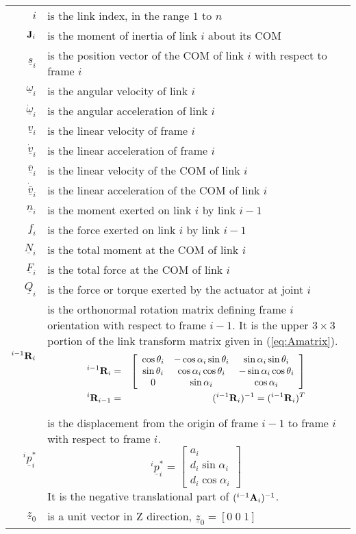 \documentclass{article}
\renewcommand{\vec}[1]{\underline{#1}}
\begin{document}
\begin{longtable}{r p{12cm}}
$i$ & is the link index, in the range $1$ to $n$ \\
${\bf J}_i$ & is the moment of inertia of link $i$ about its COM\\
$\vec{s}_i$ & is the position vector of the COM of link $i$ with respect to
frame $i$\\
$\vec{\omega}_i$ & is the angular velocity of link $i$\\
$\dot{\vec{\omega}}_i$ & is the angular acceleration of link $i$\\
$\vec{v}_i$ & is the linear velocity of frame $i$\\
$\dot{\vec{v}}_i$ & is the linear acceleration of frame $i$\\
$\vec{\overline{v}}_i$ & is the linear velocity of the COM of link $i$ \\
$\dot{\vec{\overline{v}}}_i$ & is the linear acceleration of the COM of link
$i$ \\
$\vec{n}_i$ & is the moment exerted on link $i$ by link $i-1$ \\
$\vec{f}_i$ & is the force exerted on link $i$ by link $i-1$ \\
$\vec{N}_i$ & is the total moment at the COM of link $i$\\
$\vec{F}_i$ & is the total force at the COM of link $i$ \\
$\vec{Q}_i$ & is the force or torque exerted by the actuator at joint $i$\\
${}^{i-1} {\bf R}_i$ & is the orthonormal rotation matrix defining
frame $i$ orientation with respect to frame $i-1$.  It is the upper $3 \times
3$
portion of the link transform matrix given in (\ref{eq:Amatrix}).
\begin{eqnarray}
{}^{i-1} {\bf R}_i &=& \left[ \begin{array}{ccc}
 \cos \theta_i & -\cos \alpha_i \sin \theta_i & \sin \alpha_i \sin \theta_i \\
 \sin \theta_i & \cos \alpha_i \cos \theta_i & -\sin \alpha_i \cos \theta_i \\
 0             & \sin \alpha_i               & \cos \alpha_i
 \end{array} \right] \\
{}^{i} {\bf R}_{i-1} &=& ( {}^{i-1} {\bf R}_{i} ) ^{-1} = ( {}^{i-1} {\bf R}_{i} ) ^T
\end{eqnarray}
\\
${}^i \vec{p}_i^{*}$ & is the displacement from the origin of frame $i-1$
to frame $i$ with respect to frame $i$.
\begin{equation}
\mbox{}^i\vec{p}_i^{*} = \left[ \begin{array}{c}
	a_i \\
	d_i \sin \alpha_i \\
	d_i \cos \alpha_i
	\end{array} \right]
\end{equation}
It is the negative translational part of $({}^{i-1} {\bf A}_{i})^{-1}$.\\
$\vec{z}_0$ & is a unit vector in Z direction, $\vec{z}_0 = [0\;0\;1]$ \\
\end{longtable}
\end{document}
